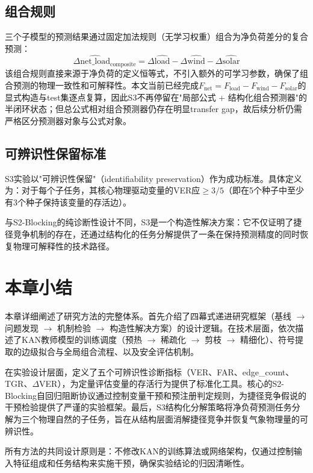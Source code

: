 \subsection{组合规则}

三个子模型的预测结果通过固定加法规则（无学习权重）组合为净负荷差分的复合预测：
\begin{equation}
\Delta\widehat{\text{net\_load}}_{\text{composite}} = \Delta\widehat{\text{load}} - \Delta\widehat{\text{wind}} - \Delta\widehat{\text{solar}}
\end{equation}
该组合规则直接来源于净负荷的定义恒等式，不引入额外的可学习参数，确保了组合预测的物理一致性和可解释性。本文当前已经完成$F_{\text{net}} = F_{\text{load}} - F_{\text{wind}} - F_{\text{solar}}$的显式构造与test集逐点复算，因此S3不再停留在"局部公式 + 结构化组合预测器"的半闭环状态；但总公式相对组合预测器仍存在明显transfer gap，故后续分析仍需严格区分预测器对象与公式对象。

\subsection{可辨识性保留标准}

S3实验以"可辨识性保留"（identifiability preservation）作为成功标准。具体定义为：对于每个子任务，其核心物理驱动变量的VER应$\geq 3/5$（即在5个种子中至少有3个种子保持该变量的存活边）。

与S2-Blocking的纯诊断性设计不同，S3是一个构造性解决方案：它不仅证明了捷径竞争机制的存在，还通过结构化的任务分解提供了一条在保持预测精度的同时恢复物理可解释性的技术路径。

\section{本章小结}

本章详细阐述了研究方法的完整体系。首先介绍了四幕式递进研究框架（基线 $\to$ 问题发现 $\to$ 机制检验 $\to$ 构造性解决方案）的设计逻辑。在技术层面，依次描述了KAN教师模型的训练调度（预热 $\to$ 稀疏化 $\to$ 剪枝 $\to$ 精细化）、符号提取的边级拟合与全局组合流程、以及安全评估机制。

在实验设计层面，定义了五个可辨识性诊断指标（VER、FAR、edge\_count、TGR、$\Delta$VER），为定量评估变量的存活行为提供了标准化工具。核心的S2-Blocking自回归阻断协议通过控制变量干预和预注册判定规则，为捷径竞争假说的干预检验提供了严谨的实验框架。最后，S3结构化分解策略将净负荷预测任务分解为三个物理自然的子任务，旨在从结构层面消解捷径竞争并恢复气象物理量的可辨识性。

所有方法的共同设计原则是：不修改KAN的训练算法或网络架构，仅通过控制输入特征组成和任务结构来实施干预，确保实验结论的归因清晰性。
